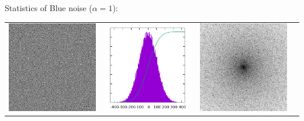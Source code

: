 

Statistics of Blue noise ($\alpha=1$):

\begin{tabular}{cccc}
	\includegraphics{KK+1.png} &
	\includegraphics{KK+1_h.png} &
	\includegraphics{KK+1_f.png} &

\end{tabular}
